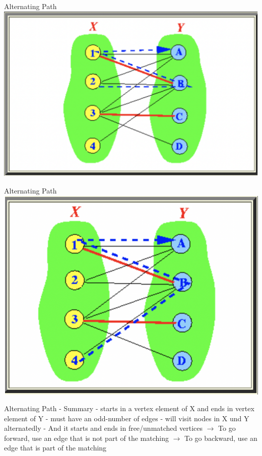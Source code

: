 \begin{frame}{Alternating Path}
\includegraphics[width=.8
\linewidth]{img/bipartite/alternating2.png}
  
\end{frame}

\begin{frame}{Alternating Path}
\includegraphics[width=.8\linewidth]{img/bipartite/alternating3.png}
  
\end{frame}

\begin{frame}{Alternating Path - Summary}
- starts in a vertex element of X and ends in vertex element of Y\newline
- must have an odd-number of edges\newline
- will visit nodes in X und Y alternatedly\newline
- And it starts and ends in free/unmatched vertices\newline
\newline
$\rightarrow$ To go forward, use an edge that is not part of the matching\newline
$\rightarrow$ To go backward, use an edge that is part of the matching\newline
  
\end{frame}

